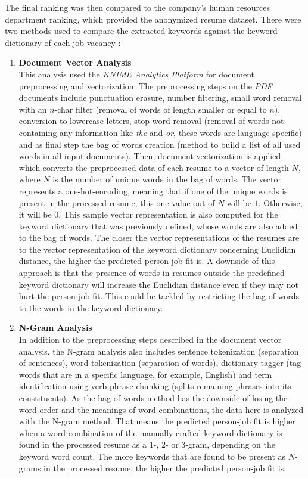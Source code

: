 \documentclass[draft,final]{thesisclass} %
\begin{document}
The final ranking was then compared to the company's human resources department ranking, which provided the anonymized resume dataset.
There were two methods used to compare the extracted keywords against the keyword dictionary of each job vacancy \parencite[53-58]{text_mining_for_automatic_profiling}:
\begin{enumerate}
    \item \textbf{Document Vector Analysis}\\
    This analysis used the \textit{KNIME Analytics Platform} for document preprocessing and vectorization.
    The preprocessing steps on the \textit{PDF} documents include punctuation erasure, number filtering, small word removal with an $n$-char filter (removal of words of length smaller or equal to $n$), conversion to lowercase letters, stop word removal (removal of words not containing any information like \textit{the} and \textit{or}, these words are language-specific) and as final step the bag of words creation (method to build a list of all used words in all input documents).
    Then, document vectorization is applied, which converts the preprocessed data of each resume to a vector of length $N$, where $N$ is the number of unique words in the bag of words.
    The vector represents a one-hot-encoding, meaning that if one of the unique words is present in the processed resume, this one value out of $N$ will be $1$. Otherwise, it will be $0$.
    This sample vector representation is also computed for the keyword dictionary that was previously defined, whose words are also added to the bag of words.
    The closer the vector representations of the resumes are to the vector representation of the keyword dictionary concerning Euclidian distance, the higher the predicted person-job fit is.
    A downside of this approach is that the presence of words in resumes outside the predefined keyword dictionary will increase the Euclidian distance even if they may not hurt the person-job fit. 
    This could be tackled by restricting the bag of words to the words in the keyword dictionary.
    \item \textbf{N-Gram Analysis}\\
    In addition to the preprocessing steps described in the document vector analysis, the N-gram analysis also includes sentence tokenization (separation of sentences), word tokenization (separation of words), dictionary tagger (tag words that are in a specific language, for example, English) and term identification using verb phrase chunking (splits remaining phrases into its constituents).
    As the bag of words method has the downside of losing the word order and the meanings of word combinations, the data here is analyzed with the N-gram method.
    That means the predicted person-job fit is higher when a word combination of the manually crafted keyword dictionary is found in the processed resume as a $1$-, $2$- or $3$-gram, depending on the keyword word count.
    The more keywords that are found to be present as $N$-grams in the processed resume, the higher the predicted person-job fit is.
\end{enumerate}
\end{document}
